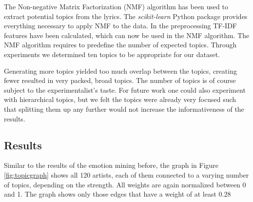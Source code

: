 \documentclass[10pt,a4paper]{article}
\begin{document}
	The Non-negative Matrix Factorization (NMF) algorithm has been used to extract potential topics from the lyrics. The \textit{scikit-learn} Python package provides everything necessary to apply NMF to the data. In the preprocessing TF-IDF features have been calculated, which can now be used in the NMF algorithm. The NMF algorithm requires to predefine the number of expected topics. Through experiments we determined ten topics to be appropriate for our dataset. 
	
	Generating more topics yielded too much overlap between the topics, creating fewer resulted in very packed, broad topics. The number of topics is of course subject to the experimentalist's taste. For future work one could also experiment with hierarchical topics, but we felt the topics were already very focused such that splitting them up any further would not increase the informativeness of the results.
	
		\subsection{Results}
		Similar to the results of the emotion mining before, the graph in Figure \ref{fig:topicgraph} shows all 120 artists, each of them connected to a varying number of topics, depending on the strength. All weights are again normalized between 0 and 1. The graph shows only those edges that have a weight of at least $0.28$
		
\end{document}
